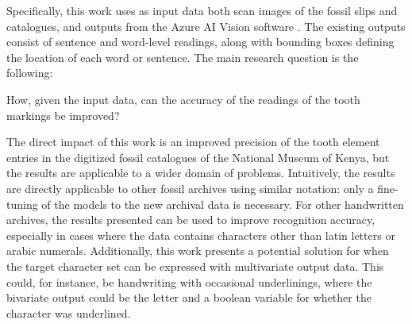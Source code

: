 \documentclass{article}
\begin{document}
Specifically, this work uses as input data both scan images of the fossil slips and catalogues, and outputs from the Azure AI Vision software \cite{azurevision}. The existing outputs consist of sentence and word-level readings, along with bounding boxes defining 
the location of each word or sentence. The main research question is the following: 

How, given the input data, can the accuracy of the readings of the tooth markings be improved?






The direct impact of this work is an improved precision of the tooth element entries in the digitized 
fossil catalogues of the National Museum of Kenya, but the results are applicable to a wider domain of problems.
Intuitively, the results are directly applicable to other fossil archives using similar notation: only a fine-tuning of the 
models to the new archival data is necessary.
For other handwritten archives, the results presented can be used to improve recognition accuracy, especially in cases 
where the data contains characters other than latin letters or arabic numerals. Additionally, this work presents
a potential solution for when the target character set can be expressed with multivariate output data. This could, for 
instance, be handwriting with occasional underlinings, where the bivariate output could be the letter and a boolean variable for 
whether the character was underlined.
\end{document}
